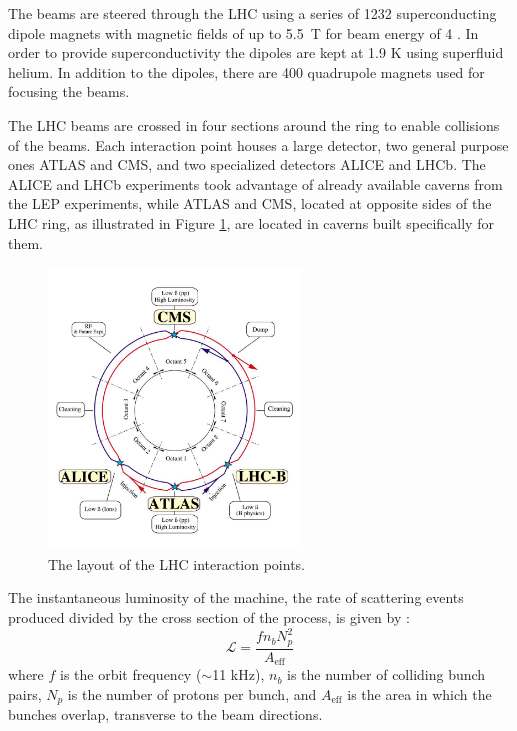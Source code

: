The beams are steered through the LHC 
using a series of 1232 superconducting dipole magnets with magnetic fields 
of up to 5.5~T for beam energy of 4 \TeV. In order to provide superconductivity the 
dipoles are kept at 1.9 K using superfluid helium.
In addition to the dipoles, there are 400 quadrupole magnets used
for focusing the beams.

The LHC beams are
crossed in four sections around the ring to enable collisions of the beams. Each interaction point
houses a large detector, two general purpose ones ATLAS and CMS, and two specialized detectors
ALICE and LHCb. The ALICE and LHCb experiments took advantage of already available caverns from
the LEP experiments, while ATLAS and CMS, located at opposite sides of the LHC ring, as illustrated
in Figure \ref{fig:lhc}, are located in caverns built specifically for them.

\begin{figure}[htbp]
\centering
\includegraphics[width=0.6\textwidth]{plots/intro/lhc.jpg}
\caption{The layout of the LHC interaction points.\label{fig:lhc}}
\end{figure}

The instantaneous luminosity of the machine, \ie the rate of scattering events produced divided
by the cross section of the process, is given by \cite{Aaij:2011er}:
\begin{equation}
\mathcal{L}=\frac{f n_b N_p^2}{A_{\mathrm{eff}}}
\end{equation}
where $f$ is the orbit frequency ($\sim$11 kHz), $n_b$ is the number of colliding bunch pairs, 
$N_p$ is the number of protons per bunch, and $A_{\mathrm{eff}}$ is the area in which the bunches
overlap, transverse to the beam directions.


